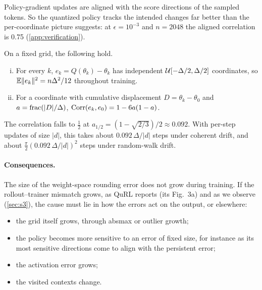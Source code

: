 Policy-gradient updates are aligned with the score directions of the sampled tokens. So the quantized policy tracks the intended changes far better than the per-coordinate picture suggests: at $\epsilon=10^{-3}$ and $n=2048$ the aligned correlation is 0.75 (\cref{app:verification}).

\begin{proposition}\label{prop:persistence}
On a fixed grid, the following hold.
\begin{enumerate}[(i),leftmargin=*,itemsep=1pt]
\item For every $k$, $e_k=Q(\theta_k)-\theta_k$ has independent $\mathcal{U}[-\Delta/2,\Delta/2]$ coordinates, so $\mathbb{E}\|e_k\|^2=n\Delta^2/12$ throughout training.
\item For a coordinate with cumulative displacement $D=\theta_k-\theta_0$ and $a=\operatorname{frac}(|D|/\Delta)$, $\operatorname{Corr}(e_k,e_0)=1-6a(1-a)$.
\end{enumerate}
\end{proposition}

\begin{corollary}\label{cor:persistence-time}
The correlation falls to $\tfrac12$ at $a_{1/2}=(1-\sqrt{2/3})/2\approx0.092$. With per-step updates of size $|d|$, this takes about $0.092\,\Delta/|d|$ steps under coherent drift, and about $\tfrac\pi2(0.092\,\Delta/|d|)^2$ steps under random-walk drift.
\end{corollary}

\paragraph{Consequences.} The size of the weight-space rounding error does not grow during training. If the rollout--trainer mismatch grows, as QuRL reports (its Fig.~3a) and as we observe (\cref{sec:s3}), the cause must lie in how the errors act on the output, or elsewhere:
\begin{itemize}[leftmargin=*,itemsep=1pt]
\item the grid itself grows, through absmax or outlier growth;
\item the policy becomes more sensitive to an error of fixed size, for instance as its most sensitive directions come to align with the persistent error;
\item the activation error grows;
\item the visited contexts change.
\end{itemize}

